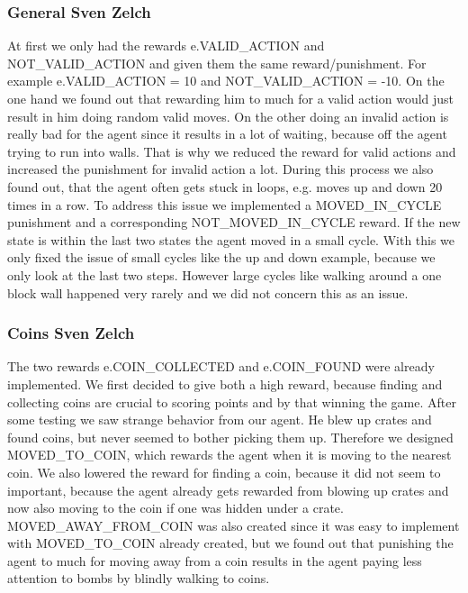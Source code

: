 \documentclass[
	letterpaper, %
	12pt, %
]{CSUniSchoolLabReport}
\begin{document}
\subsubsection{General \tiny Sven Zelch}
At first we only had the rewards e.VALID\_ACTION and NOT\_VALID\_ACTION and given them the same reward/punishment.
For example e.VALID\_ACTION = 10 and NOT\_VALID\_ACTION = -10.
On the one hand we found out that rewarding him to much for a valid action would just result in him doing random valid moves.
On the other doing an invalid action is really bad for the agent since it results in a lot of waiting, because off the agent trying to run into walls.
That is why we reduced the reward for valid actions and increased the punishment for invalid action a lot.
During this process we also found out, that the agent often gets stuck in loops, e.g. moves up and down 20 times in a row.
To address this issue we implemented a MOVED\_IN\_CYCLE punishment and a corresponding NOT\_MOVED\_IN\_CYCLE reward.
If the new state is within the last two states the agent moved in a small cycle.
With this we only fixed the issue of small cycles like the up and down example, because we only look at the last two steps.
However large cycles like walking around a one block wall happened very rarely and we did not concern this as an issue.

\subsubsection{Coins \tiny Sven Zelch}
The two rewards e.COIN\_COLLECTED and e.COIN\_FOUND were already implemented.
We first decided to give both a high reward, because finding and collecting coins are crucial to scoring points and by that winning the game.
After some testing we saw strange behavior from our agent. He blew up crates and found coins, but never seemed to bother picking them up.
Therefore we designed MOVED\_TO\_COIN, which rewards the agent when it is moving to the nearest coin.
We also lowered the reward for finding a coin, because it did not seem to important, because the agent already gets rewarded from blowing up crates and now also moving to the coin if one was hidden under a crate.
MOVED\_AWAY\_FROM\_COIN was also created since it was easy to implement with MOVED\_TO\_COIN already created, but we found out that punishing the agent to much for moving away from a coin results in the agent paying less attention to bombs by blindly walking to coins.
\end{document}
